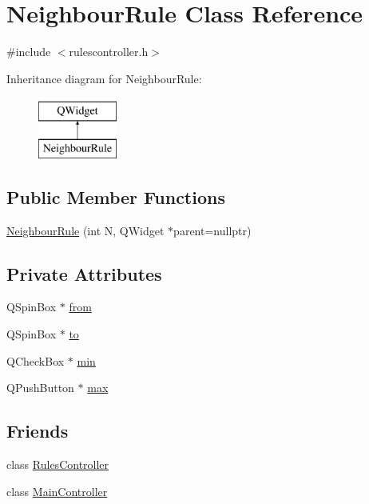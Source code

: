 \hypertarget{class_neighbour_rule}{}\section{Neighbour\+Rule Class Reference}
\label{class_neighbour_rule}


{\ttfamily \#include $<$rulescontroller.\+h$>$}

Inheritance diagram for Neighbour\+Rule\+:\begin{figure}[H]
\begin{center}
\leavevmode
\includegraphics[height=2.000000cm]{class_neighbour_rule}
\end{center}
\end{figure}
\subsection*{Public Member Functions}
\begin{DoxyCompactItemize}
\item 
\mbox{\hyperlink{class_neighbour_rule_ab9bd69920202b3826ea959ec5b309fe0}{Neighbour\+Rule}} (int N, Q\+Widget $\ast$parent=nullptr)
\end{DoxyCompactItemize}
\subsection*{Private Attributes}
\begin{DoxyCompactItemize}
\item 
Q\+Spin\+Box $\ast$ \mbox{\hyperlink{class_neighbour_rule_aa0dd87a547aa630fc741bcd1ed7c3007}{from}}
\item 
Q\+Spin\+Box $\ast$ \mbox{\hyperlink{class_neighbour_rule_a9fd5cf760c4ccfeefb104f24e6488a51}{to}}
\item 
Q\+Check\+Box $\ast$ \mbox{\hyperlink{class_neighbour_rule_a55af8eae63687835de271eee068732ce}{min}}
\item 
Q\+Push\+Button $\ast$ \mbox{\hyperlink{class_neighbour_rule_ab62a36811d4af2b13f7d25820a8eaab6}{max}}
\end{DoxyCompactItemize}
\subsection*{Friends}
\begin{DoxyCompactItemize}
\item 
class \mbox{\hyperlink{class_neighbour_rule_a4a3b7cfb8cbef548cad1c2c16c6ce941}{Rules\+Controller}}
\item 
class \mbox{\hyperlink{class_neighbour_rule_a154f5ffe46dc74c6c94311b4cc3927ae}{Main\+Controller}}
\end{DoxyCompactItemize}


